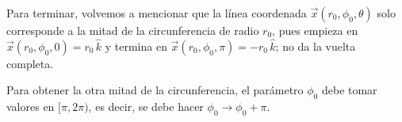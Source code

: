 \documentclass[../apunte_mecanica_clasica.tex]{subfiles}%
\begin{document}
Para terminar, volvemos a mencionar que la línea coordenada $\vec{x}(r_0, \phi_0, \theta)$ solo corresponde a la mitad de la circunferencia de radio $r_0$, pues empieza en $\vec{x}(r_0, \phi_0, 0) = r_0 \, \hat{k}$ y termina en $\vec{x}(r_0, \phi_0, \pi) = -r_0 \, \hat{k}$; no da la vuelta completa.

Para obtener la otra mitad de la circunferencia, el parámetro $\phi_0$ debe tomar valores en $[\pi, 2\pi)$, es decir, se debe hacer $\phi_0 \to \phi_0 + \pi$.

\newpage
\end{document}
